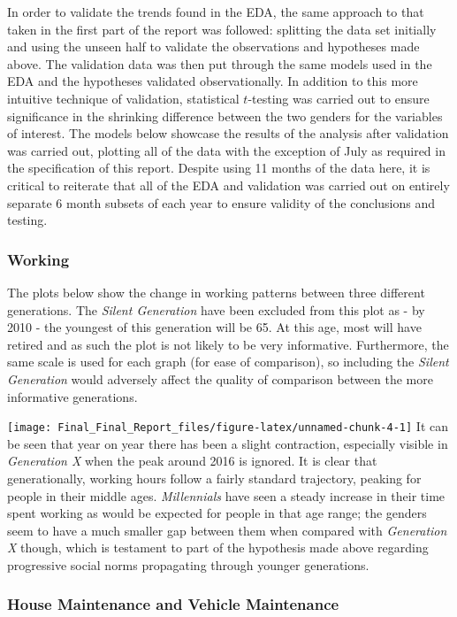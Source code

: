 \documentclass[11pt,]{article}
\begin{document}
In order to validate the trends found in the EDA, the same approach to
that taken in the first part of the report was followed: splitting the
data set initially and using the unseen half to validate the
observations and hypotheses made above. The validation data was then put
through the same models used in the EDA and the hypotheses validated
observationally. In addition to this more intuitive technique of
validation, statistical \(t\)-testing was carried out to ensure
significance in the shrinking difference between the two genders for the
variables of interest. The models below showcase the results of the
analysis after validation was carried out, plotting all of the data with
the exception of July as required in the specification of this report.
Despite using 11 months of the data here, it is critical to reiterate
that all of the EDA and validation was carried out on entirely separate
6 month subsets of each year to ensure validity of the conclusions and
testing.

\hypertarget{working}{%
\subsubsection{Working}\label{working}}

The plots below show the change in working patterns between three
different generations. The \emph{Silent Generation} have been excluded
from this plot as - by 2010 - the youngest of this generation will be
65. At this age, most will have retired and as such the plot is not
likely to be very informative. Furthermore, the same scale is used for
each graph (for ease of comparison), so including the \emph{Silent
Generation} would adversely affect the quality of comparison between the
more informative generations.

\texttt{[image: Final\_Final\_Report\_files/figure-latex/unnamed-chunk-4-1]}
It can be seen that year on year there has been a slight contraction,
especially visible in \emph{Generation X} when the peak around 2016 is
ignored. It is clear that generationally, working hours follow a fairly
standard trajectory, peaking for people in their middle ages.
\emph{Millennials} have seen a steady increase in their time spent
working as would be expected for people in that age range; the genders
seem to have a much smaller gap between them when compared with
\emph{Generation X} though, which is testament to part of the hypothesis
made above regarding progressive social norms propagating through
younger generations.

\hypertarget{house-maintenance-and-vehicle-maintenance}{%
\subsubsection{House Maintenance and Vehicle
Maintenance}\label{house-maintenance-and-vehicle-maintenance}}
\end{document}

